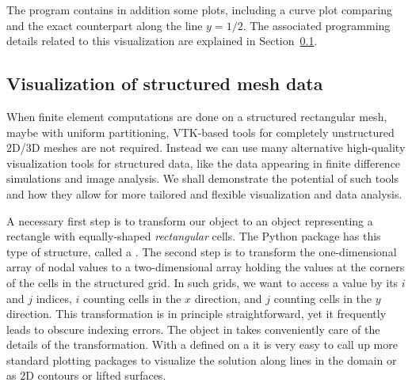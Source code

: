 The program  contains in
addition some plots, including a curve plot comparing
 and the exact counterpart along
the line $y=1/2$.  The associated programming details related to this
visualization are explained in Section~\ref{langtangen:structviz}.

\subsection{Visualization of structured mesh data}
\label{langtangen:structviz}

When finite element computations are done on a structured rectangular
mesh, maybe with uniform partitioning, VTK-based tools for completely
unstructured 2D/3D meshes are not required.  Instead we can use many
alternative high-quality visualization tools for structured data, like
the data appearing in finite difference simulations and image
analysis.  We shall demonstrate the potential of such tools and how
they allow for more tailored and flexible visualization and data
analysis.

A necessary first step is to transform our
 object to an object representing
a rectangle with equally-shaped \emph{rectangular} cells.  The Python
package  has this type of
structure, called a
. The second step is to
transform the one-dimensional array of nodal values to a
two-dimensional array holding the values at the corners of the cells
in the structured grid. In such grids, we want to access a value by
its $i$ and $j$ indices, $i$ counting cells in the $x$ direction, and
$j$ counting cells in the $y$ direction.  This transformation is in
principle straightforward, yet it frequently leads to obscure indexing
errors. The  object in
 takes conveniently care of
the details of the transformation.  With a
 defined on a
 it is very easy to call
up more standard plotting packages to visualize the solution along
lines in the domain or as 2D contours or lifted surfaces.

